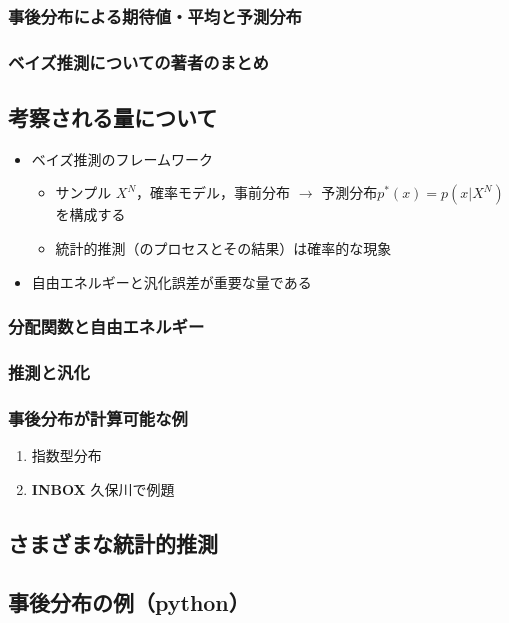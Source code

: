 \subsubsection{事後分布による期待値・平均と予測分布}
\subsubsection{ベイズ推測についての著者のまとめ}

\subsection{考察される量について}
\begin{itemize}
\item ベイズ推測のフレームワーク
\begin{itemize}
\item サンプル \({X^N}\)，確率モデル，事前分布 \({\to}\) 予測分布\({p^{*}(x)=p(x|X^N)}\)  を構成する
\item 統計的推測（のプロセスとその結果）は確率的な現象
\end{itemize}
\item 自由エネルギーと汎化誤差が重要な量である
\end{itemize}

\subsubsection{分配関数と自由エネルギー}

\subsubsection{推測と汎化}

\subsubsection{事後分布が計算可能な例}

\begin{enumerate}
\item 指数型分布

\item {\bfseries\sffamily INBOX} 久保川で例題
\end{enumerate}

\subsection{さまざまな統計的推測}


\subsection{事後分布の例（python）}

